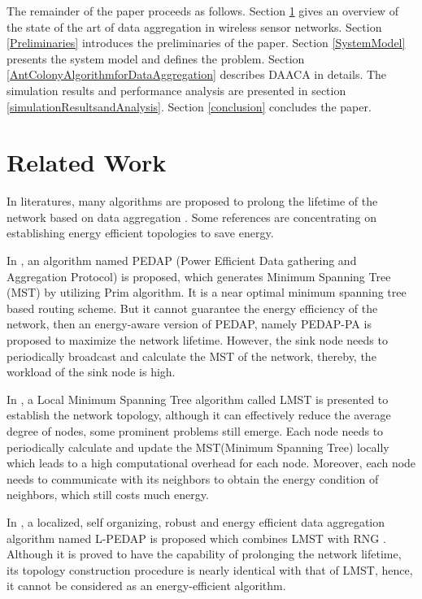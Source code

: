 \documentclass{elsarticle}
\begin{document}
The remainder of the paper proceeds as follows. Section \ref{relatedWork} gives an overview of the state of the art of data aggregation in wireless sensor networks. Section \ref{Preliminaries} introduces the preliminaries of the paper. Section \ref{SystemModel} presents the system model and defines the problem. Section \ref{AntColonyAlgorithmforDataAggregation} describes DAACA in details. The simulation results and performance analysis are presented in section \ref{simulationResultsandAnalysis}. Section \ref{conclusion} concludes the paper.

\section{Related Work} \label{relatedWork}
In literatures, many algorithms are proposed to prolong the lifetime of the network based on data aggregation \cite{label-29, label-30, label-31, label-6,label-7,label-8,label-10}. Some references are concentrating on establishing energy efficient topologies to save energy.

In \cite{label-6}, an algorithm named PEDAP (Power Efficient Data gathering and Aggregation Protocol) is proposed, which generates Minimum Spanning Tree (MST) by utilizing Prim algorithm. It is a near optimal minimum spanning tree based routing scheme. But it cannot guarantee the energy efficiency of the network, then an energy-aware version of PEDAP, namely PEDAP-PA is proposed to maximize the network lifetime. However, the sink node needs to periodically broadcast and calculate the MST of the network, thereby, the workload of the sink node is high.


In \cite{label-7}, a Local Minimum Spanning Tree algorithm called LMST is presented to establish the network topology, although it can effectively reduce the average degree of nodes, some prominent problems still emerge. Each node needs to periodically calculate and update the MST(Minimum Spanning Tree) locally which leads to a high computational overhead for each node. Moreover, each node needs to communicate with its neighbors to obtain the energy condition of neighbors, which still costs much energy.


In \cite{label-8}, a localized, self organizing, robust and energy efficient data aggregation algorithm named L-PEDAP is proposed which combines LMST with RNG \cite{label-9}. Although it is proved to have the capability of prolonging the network lifetime, its topology construction procedure is nearly identical with that of LMST, hence, it cannot be considered as an energy-efficient algorithm.
\end{document}
